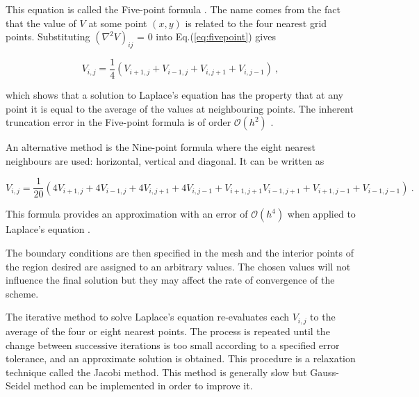 \documentclass[a4paper]{jpconf}
\begin{document}
\noindent This equation is called the Five-point formula \cite{Cheney.Kincai-NumericalMethods}. The name comes from the fact that the value of $V$ at some point $(x,y)$ is related to the four nearest grid points. Substituting $(\nabla^2 V)_{ij}$ = 0 into Eq.(\ref{eq:fivepoint}) gives 

\begin{equation}
V_{i,j} = \frac{1}{4}(V_{i+1,j} + V_{i-1,j} + V_{i,j+1} + V_{i,j-1})~,
\end{equation}

\noindent which shows that a solution to Laplace's equation has the property that at any point it is equal to the average of the values at neighbouring points. The inherent truncation error in the Five-point formula is of order $\mathcal{O}(h^2)$ \cite{Cheney.Kincai-NumericalMethods}.  \par

An alternative method is the Nine-point formula where the eight nearest neighbours are used: horizontal, vertical and diagonal. It can be written as


\begin{equation}
V_{i,j} = \frac{1}{20}(4V_{i+1,j} + 4V_{i-1,j} + 4V_{i,j+1} + 4V_{i,j-1} + V_{i+1,j+1} V_{i-1,j+1} + V_{i+1,j-1} + V_{i-1,j-1})~.
\end{equation}

\noindent This formula provides an approximation with an error of $\mathcal{O}(h^4)$ when applied to Laplace's equation \cite{AI-numericalAna}. 

The boundary conditions are then specified in the mesh and the interior points of the region desired are assigned to an arbitrary values. The chosen values will not influence the final solution but they may affect the rate of convergence of the scheme. \par

The iterative method to solve Laplace's equation re-evaluates each $V_{i,j}$ to the average of the four or eight nearest points. The process is repeated until the change between successive iterations is too small according to a specified error tolerance, and an approximate solution is obtained. 
This procedure is a relaxation technique called the Jacobi method. This method is generally slow but Gauss-Seidel method can be implemented in order to improve it. \par
\end{document}
